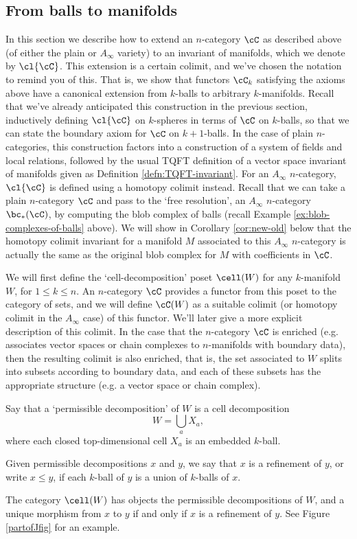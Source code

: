 \subsection{From balls to manifolds}
\label{ss:ncat_fields} \label{ss:ncat-coend}
In this section we describe how to extend an $n$-category $\cC$ as described above 
(of either the plain or $A_\infty$ variety) to an invariant of manifolds, which we denote by $\cl{\cC}$.
This extension is a certain colimit, and we've chosen the notation to remind you of this.
That is, we show that functors $\cC_k$ satisfying the axioms above have a canonical extension 
from $k$-balls to arbitrary $k$-manifolds.
Recall that we've already anticipated this construction in the previous section, 
inductively defining $\cl{\cC}$ on $k$-spheres in terms of $\cC$ on $k$-balls, 
so that we can state the boundary axiom for $\cC$ on $k+1$-balls.
In the case of plain $n$-categories, this construction factors into a construction of a 
system of fields and local relations, followed by the usual TQFT definition of a 
vector space invariant of manifolds given as Definition \ref{defn:TQFT-invariant}.
For an $A_\infty$ $n$-category, $\cl{\cC}$ is defined using a homotopy colimit instead.
Recall that we can take a plain $n$-category $\cC$ and pass to the `free resolution', 
an $A_\infty$ $n$-category $\bc_*(\cC)$, by computing the blob complex of balls (recall Example \ref{ex:blob-complexes-of-balls} above).
We will show in Corollary \ref{cor:new-old} below that the homotopy colimit invariant 
for a manifold $M$ associated to this $A_\infty$ $n$-category is actually the same as the original blob complex  for $M$ with coefficients in $\cC$.

We will first define the `cell-decomposition' poset $\cell(W)$ for any $k$-manifold $W$, for $1 \leq k \leq n$. 
An $n$-category $\cC$ provides a functor from this poset to the category of sets, 
and we  will define $\cC(W)$ as a suitable colimit 
(or homotopy colimit in the $A_\infty$ case) of this functor. 
We'll later give a more explicit description of this colimit.
In the case that the $n$-category $\cC$ is enriched (e.g. associates vector spaces or chain complexes to $n$-manifolds with boundary data), 
then the resulting colimit is also enriched, that is, the set associated to $W$ splits into subsets according to boundary data, and each of these subsets has the appropriate structure (e.g. a vector space or chain complex).

\begin{defn}
Say that a `permissible decomposition' of $W$ is a cell decomposition
\[
	W = \bigcup_a X_a ,
\]
where each closed top-dimensional cell $X_a$ is an embedded $k$-ball.

Given permissible decompositions $x$ and $y$, we say that $x$ is a refinement
of $y$, or write $x \le y$, if each $k$-ball of $y$ is a union of $k$-balls of $x$.

The category $\cell(W)$ has objects the permissible decompositions of $W$, 
and a unique morphism from $x$ to $y$ if and only if $x$ is a refinement of $y$.
See Figure \ref{partofJfig} for an example.
\end{defn}

